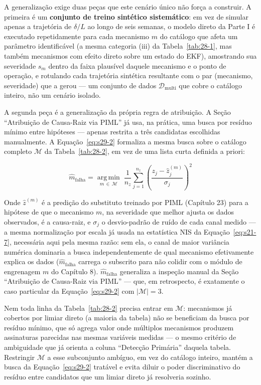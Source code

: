 \documentclass[12pt,a4paper]{article}
\numberwithin{equation}{section}
\numberwithin{table}{section}
\numberwithin{figure}{section}
\begin{document}
A generalização exige duas peças que este cenário único não força a construir. A primeira é um \textbf{conjunto de treino sintético sistemático}: em vez de simular apenas a trajetória de $\delta/L$ ao longo de seis semanas, o modelo direto da Parte I é executado repetidamente para cada mecanismo $m$ do catálogo que afeta um parâmetro identificável (a mesma categoria (iii) da Tabela~\ref{tab:28-1}, mas também mecanismos com efeito direto sobre um estado do EKF), amostrando sua severidade $s_m$ dentro da faixa plausível daquele mecanismo e o ponto de operação, e rotulando cada trajetória sintética resultante com o par (mecanismo, severidade) que a gerou — um conjunto de dados $\mathcal{D}_{\text{multi}}$ que cobre o catálogo inteiro, não um cenário isolado.

A segunda peça é a generalização da própria regra de atribuição. A Seção ``Atribuição de Causa-Raiz via PIML'' já usa, na prática, uma busca por resíduo mínimo entre hipóteses — apenas restrita a três candidatas escolhidas manualmente. A Equação~\eqref{eq:s29-2} formaliza a mesma busca sobre o catálogo completo $\mathcal{M}$ da Tabela~\ref{tab:28-2}, em vez de uma lista curta definida a priori:

\begin{equation}\label{eq:s29-2}
\hat{m}_{\text{falha}} = \operatorname*{arg\,min}_{m \, \in \, \mathcal{M}} \; \frac{1}{n_z}\sum_{j=1}^{n_z} \left( \frac{z_j - \hat{z}_j^{(m)}}{\sigma_j} \right)^{2}
\end{equation}

Onde $\hat{z}^{(m)}$ é a predição do substituto treinado por PIML (Capítulo 23) para a hipótese de que o mecanismo $m$, na severidade que melhor ajusta os dados observados, é a causa-raiz, e $\sigma_j$ o desvio-padrão de ruído de cada canal medido — a mesma normalização por escala já usada na estatística NIS da Equação~\eqref{eq:s21-7}, necessária aqui pela mesma razão: sem ela, o canal de maior variância numérica dominaria a busca independentemente de qual mecanismo efetivamente explica os dados ($\hat{m}_{\text{falha}}$ carrega o subscrito para não colidir com o módulo de engrenagem $m$ do Capítulo 8). $\hat{m}_{\text{falha}}$ generaliza a inspeção manual da Seção ``Atribuição de Causa-Raiz via PIML'' — que, em retrospecto, é exatamente o caso particular da Equação~\eqref{eq:s29-2} com $|\mathcal{M}|=3$.

Nem toda linha da Tabela~\ref{tab:28-2} precisa entrar em $\mathcal{M}$: mecanismos já cobertos por limiar direto (a maioria da tabela) não se beneficiam da busca por resíduo mínimo, que só agrega valor onde múltiplos mecanismos produzem assinaturas parecidas nas mesmas variáveis medidas — o mesmo critério de ambiguidade que já orienta a coluna ``Detecção Primária'' daquela tabela. Restringir $\mathcal{M}$ a esse subconjunto ambíguo, em vez do catálogo inteiro, mantém a busca da Equação~\eqref{eq:s29-2} tratável e evita diluir o poder discriminativo do resíduo entre candidatos que um limiar direto já resolveria sozinho.
\end{document}
